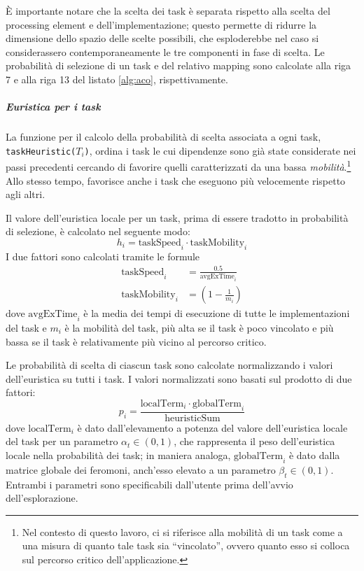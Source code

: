 \`E importante notare che la scelta dei task \`e separata rispetto alla scelta del processing element e
dell'implementazione; questo permette di ridurre la dimensione dello spazio delle scelte possibili,
che esploderebbe nel caso si considerassero contemporaneamente le tre componenti in fase di scelta.
Le probabilit\`a di selezione di un task e del relativo mapping sono calcolate alla riga 7 e alla riga
13 del listato \ref{alg:aco}, rispettivamente.

\subparagraph{Euristica per i task}
La funzione per il calcolo della probabilit\`a di scelta associata a ogni task,
\verb+taskHeuristic(+$T_i$\verb+)+, ordina i task le cui dipendenze sono gi\`a state
considerate nei passi precedenti cercando di favorire quelli caratterizzati da una bassa
\emph{mobilit\`a}.\footnote{Nel contesto di questo lavoro, ci si riferisce alla mobilit\`a di un
  task come a una misura di quanto tale task sia ``vincolato'', ovvero quanto esso
si colloca sul percorso critico dell'applicazione.}
Allo stesso tempo, favorisce anche i task che eseguono pi\`u velocemente rispetto agli altri.

Il valore dell'euristica locale per un task, prima di essere tradotto in probabilit\`a di
selezione, \`e calcolato nel seguente modo:
\begin{equation}
  h_i = \text{taskSpeed}_i \cdot \text{taskMobility}_i
\end{equation}
I due fattori sono calcolati tramite le formule
\begin{align*}
  \text{taskSpeed}_i &= \frac{0.5}{\text{avgExTime}_i}\\
  \text{taskMobility}_i &= (1 - \frac{1}{m_i})
\end{align*}
dove $\text{avgExTime}_i$ \`e la media dei tempi di esecuzione di tutte le implementazioni del task
e $m_i$ \`e la mobilit\`a del task, pi\`u alta se il task \`e poco vincolato e pi\`u bassa se il task
\`e relativamente pi\`u vicino al percorso critico.

Le probabilit\`a di scelta di ciascun task sono calcolate normalizzando i valori dell'euristica
su tutti i task. I valori normalizzati sono basati sul prodotto di due fattori:
\begin{equation}
  p_i = \frac{\text{localTerm}_i \cdot \text{globalTerm}_i}{\text{heuristicSum}}
\end{equation}
dove $\text{localTerm}_i$ \`e dato dall'elevamento a potenza del valore dell'euristica locale del
task per un parametro $\alpha_t \in (0,1)$, che rappresenta il peso dell'euristica locale
nella probabilit\`a dei task; in maniera analoga, $\text{globalTerm}_i$ \`e dato dalla matrice globale dei feromoni,
anch'esso elevato a un parametro $\beta_t \in (0,1)$. Entrambi i parametri sono specificabili
dall'utente prima dell'avvio dell'esplorazione.

